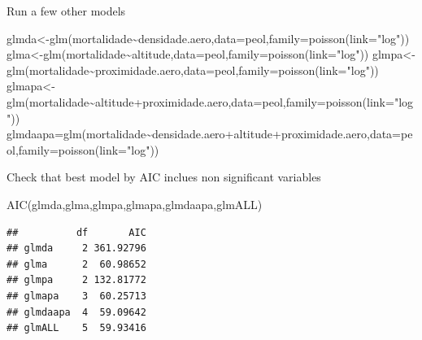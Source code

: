 \documentclass[
]{book}
\newenvironment{Shaded}{\begin{snugshade}}{\end{snugshade}}
\newcommand{\AttributeTok}[1]{\textcolor[rgb]{0.77,0.63,0.00}{#1}}
\newcommand{\FunctionTok}[1]{\textcolor[rgb]{0.00,0.00,0.00}{#1}}
\newcommand{\NormalTok}[1]{#1}
\newcommand{\OtherTok}[1]{\textcolor[rgb]{0.56,0.35,0.01}{#1}}
\newcommand{\SpecialCharTok}[1]{\textcolor[rgb]{0.00,0.00,0.00}{#1}}
\newcommand{\StringTok}[1]{\textcolor[rgb]{0.31,0.60,0.02}{#1}}
\begin{document}
Run a few other models

\begin{Shaded}
\begin{Highlighting}[]
\NormalTok{glmda}\OtherTok{\textless{}{-}}\FunctionTok{glm}\NormalTok{(mortalidade}\SpecialCharTok{\textasciitilde{}}\NormalTok{densidade.aero,}\AttributeTok{data=}\NormalTok{peol,}\AttributeTok{family=}\FunctionTok{poisson}\NormalTok{(}\AttributeTok{link=}\StringTok{"log"}\NormalTok{))}
\NormalTok{glma}\OtherTok{\textless{}{-}}\FunctionTok{glm}\NormalTok{(mortalidade}\SpecialCharTok{\textasciitilde{}}\NormalTok{altitude,}\AttributeTok{data=}\NormalTok{peol,}\AttributeTok{family=}\FunctionTok{poisson}\NormalTok{(}\AttributeTok{link=}\StringTok{"log"}\NormalTok{))}
\NormalTok{glmpa}\OtherTok{\textless{}{-}}\FunctionTok{glm}\NormalTok{(mortalidade}\SpecialCharTok{\textasciitilde{}}\NormalTok{proximidade.aero,}\AttributeTok{data=}\NormalTok{peol,}\AttributeTok{family=}\FunctionTok{poisson}\NormalTok{(}\AttributeTok{link=}\StringTok{"log"}\NormalTok{))}
\NormalTok{glmapa}\OtherTok{\textless{}{-}}\FunctionTok{glm}\NormalTok{(mortalidade}\SpecialCharTok{\textasciitilde{}}\NormalTok{altitude}\SpecialCharTok{+}\NormalTok{proximidade.aero,}\AttributeTok{data=}\NormalTok{peol,}\AttributeTok{family=}\FunctionTok{poisson}\NormalTok{(}\AttributeTok{link=}\StringTok{"log"}\NormalTok{))}
\NormalTok{glmdaapa}\OtherTok{=}\FunctionTok{glm}\NormalTok{(mortalidade}\SpecialCharTok{\textasciitilde{}}\NormalTok{densidade.aero}\SpecialCharTok{+}\NormalTok{altitude}\SpecialCharTok{+}\NormalTok{proximidade.aero,}\AttributeTok{data=}\NormalTok{peol,}\AttributeTok{family=}\FunctionTok{poisson}\NormalTok{(}\AttributeTok{link=}\StringTok{"log"}\NormalTok{))}
\end{Highlighting}
\end{Shaded}

Check that best model by AIC inclues non significant variables

\begin{Shaded}
\begin{Highlighting}[]
\FunctionTok{AIC}\NormalTok{(glmda,glma,glmpa,glmapa,glmdaapa,glmALL)}
\end{Highlighting}
\end{Shaded}

\begin{verbatim}
##          df       AIC
## glmda     2 361.92796
## glma      2  60.98652
## glmpa     2 132.81772
## glmapa    3  60.25713
## glmdaapa  4  59.09642
## glmALL    5  59.93416
\end{verbatim}
\end{document}
